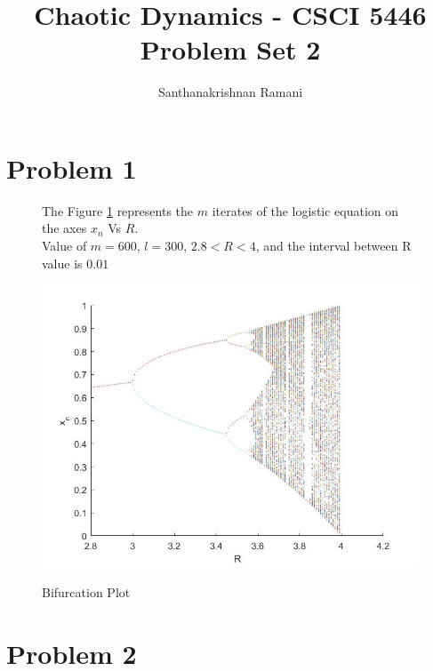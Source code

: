 \documentclass[11pt,a4paper]{article}
\title{\textbf{Chaotic Dynamics - CSCI 5446} \\
Problem Set 2}
\author{Santhanakrishnan Ramani}
\begin{document}
\maketitle
\section*{Problem 1}
\begin{figure}[H]
{
The Figure \ref{fig:prob1} represents the $m$ iterates of the logistic equation on the axes $x_{n}$ Vs $R$.\\ Value of $m = 600$, $l=300$, $2.8<R<4$, and the interval between R value is $0.01$ \par\bigskip
\centering 
\includegraphics[scale=0.5]{images/prob1.jpg}
\caption{Bifurcation Plot}\par\medskip
\label{fig:prob1}
}
\end{figure}
\newpage
\section*{Problem 2}
\end{document}
